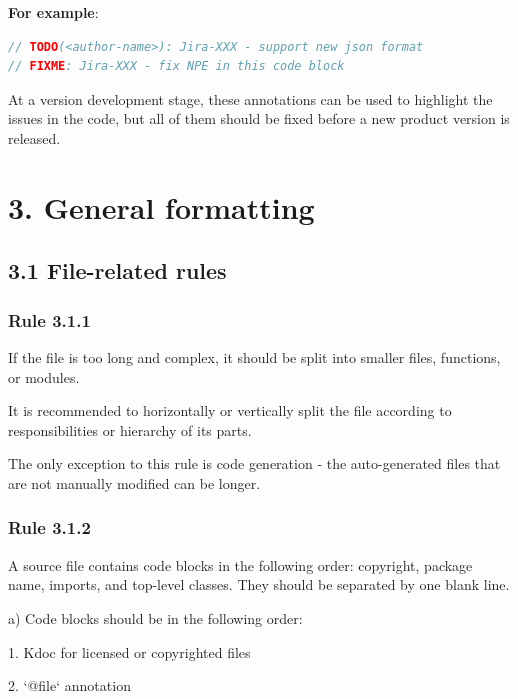 \textbf{For example}:

\begin{lstlisting}[language=Kotlin]
// TODO(<author-name>): Jira-XXX - support new json format
// FIXME: Jira-XXX - fix NPE in this code block
\end{lstlisting}


At a version development stage, these annotations can be used to highlight the issues in the code, but all of them should be fixed before a new product version is released.

\section*{\textbf{3. General formatting}}

\subsection*{\textbf{3.1 File-related rules}}

\subsubsection*{\textbf{Rule 3.1.1}}
\leavevmode\newline



If the file is too long and complex, it should be split into smaller files, functions, or modules.

It is recommended to horizontally or vertically split the file according to responsibilities or hierarchy of its parts.

The only exception to this rule is code generation - the auto-generated files that are not manually modified can be longer.



\subsubsection*{\textbf{Rule 3.1.2}}
\leavevmode\newline

A source file contains code blocks in the following order: copyright, package name, imports, and top-level classes. They should be separated by one blank line.

a) Code blocks should be in the following order:

1.	Kdoc for licensed or copyrighted files

2.	`@file` annotation

